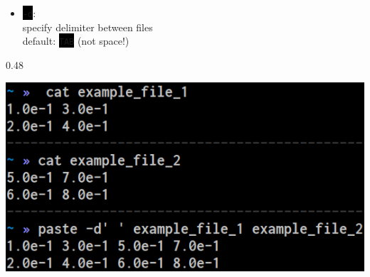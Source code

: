 \documentclass[unknownkeysallowed, 10pt, a4 paper, handout]{beamer}
\newcommand{\code}[1]{\colorbox{black}{\color{green}\texttt{#1}}}
\begin{document}
\begin{frame}
\begin{center}
{      \begin{itemize}
        \item \code{-d}:\\
          specify delimiter between files\\
          default: \code{TAB} (not space!)
      \end{itemize}
    }{\hfill}{0.48}{
      \begin{center}
        \includegraphics[width=1.00\textwidth]{pics/paste.png}
      \end{center}
    }
  \end{center}
\end{frame}
\end{document}
